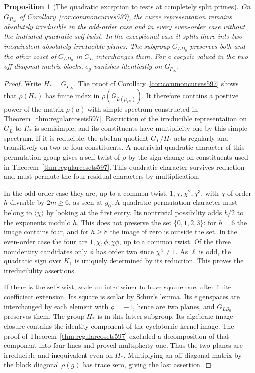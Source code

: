 \documentclass[a4paper,11pt]{article}
\newtheorem{proposition}{Proposition}[section]
\theoremstyle{definition}
\theoremstyle{remark}
\numberwithin{equation}{section}
\begin{document}
\begin{proposition}[The quadratic exception to tests at completely split primes]
\leavevmode\label{prop:splitexception598}
On \(G_{P_\infty}\) of Corollary~\ref{cor:commoncurves597},
the curve representation remains absolutely irreducible
in the odd-order case and in every even-order case without
the indicated quadratic self-twist. In the exceptional
case it splits there into two inequivalent absolutely
irreducible planes. The subgroup \(G_{LD_0}\) preserves
both and the other coset of \(G_{LD_0}\) in \(G_L\)
interchanges them. For a cocycle valued in the two
off-diagonal matrix blocks, \(e_g\) vanishes identically
on \(G_{P_\infty}\).
\end{proposition}
\begin{proof}
Write \(H_*=G_{P_\infty}\). The proof of
Corollary~\ref{cor:commoncurves597} shows that
\(\rho(H_*)\) has finite index in
\(\rho(G_{L(\mu_{\ell^\infty})})\). It therefore contains a
positive power of the matrix \(\rho(a)\) with simple spectrum
constructed in Theorem~\ref{thm:regularcosets597}.
Restriction of the irreducible representation on \(G_L\)
to \(H_*\) is semisimple, and its constituents have
multiplicity one by this simple spectrum. If it is
reducible, the abelian quotient \(G_L/H_*\) acts regularly
and transitively on two or four constituents. A nontrivial
quadratic character of this permutation group gives a
self-twist of \(\rho\) by the sign change on constituents
used in Theorem~\ref{thm:regularcosets597}. This quadratic
character survives reduction and must permute the four
residual characters by multiplication.

In the odd-order case they are, up to a common twist,
\(1,\chi,\chi^2,\chi^3\), with \(\chi\) of order \(h\)
divisible by \(2m\ge6\), as seen at \(g_0\).
A quadratic permutation character must
belong to \(\langle\chi\rangle\) by looking at the first
entry. Its nontrivial possibility adds \(h/2\) to the
exponents modulo \(h\). This does not preserve the set
\(\{0,1,2,3\}\): for \(h=6\) the image contains four,
and for \(h\ge8\) the image of zero is outside the set.
In the even-order case the four are \(1,\chi,\phi,\chi\phi\),
up to a common twist. Of the three nonidentity candidates
only \(\phi\) has order two since \(\chi^4\ne1\).
As \(\ell\) is odd, the quadratic sign over \(K_1\) is
uniquely determined by its reduction. This proves the
irreducibility assertions.

If there is the self-twist, scale an intertwiner to have
square one, after finite coefficient extension. Its square
is scalar by Schur's lemma. Its eigenspaces are interchanged
by each element with \(\phi=-1\), hence are two planes,
and \(G_{LD_0}\) preserves them. The group \(H_*\) is
in this latter subgroup. Its algebraic image closure
contains the identity component of the cyclotomic-kernel
image. The proof of Theorem~\ref{thm:regularcosets597}
excluded a decomposition of that component into four lines
and proved multiplicity one. Thus the two planes are
irreducible and inequivalent even on \(H_*\). Multiplying
an off-diagonal matrix by the block diagonal \(\rho(g)\)
has trace zero, giving the last assertion.
\end{proof}
\end{document}
